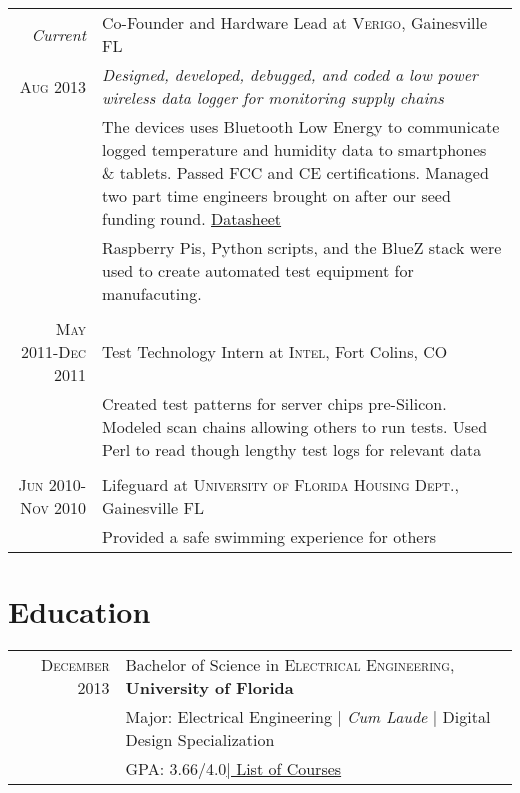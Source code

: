 \documentclass[a4paper,10pt]{article} %
\begin{document}
\begin{tabular}{r|p{11cm}}
\emph{Current} &  Co-Founder and Hardware Lead at \textsc{Verigo}, Gainesville FL \\
\textsc{Aug 2013} & \emph{Designed, developed, debugged, and coded a low power wireless data logger for monitoring supply chains}\\
&\footnotesize{The devices uses Bluetooth Low Energy to communicate logged temperature and humidity data to smartphones \& tablets. Passed FCC and CE certifications. Managed two part time engineers brought on after our seed funding round. \href{http://verigo.io/hardware.html}{Datasheet}}\\
&\footnotesize{Raspberry Pis, Python scripts, and the BlueZ stack were used to create automated test equipment for manufacuting.}\\
\multicolumn{2}{c}{} \\


\textsc{May 2011-Dec 2011} & Test Technology Intern at \textsc{Intel}, Fort Colins, CO \emph{}\\
& \footnotesize{Created test patterns for server chips pre-Silicon. Modeled scan chains allowing others to run tests. Used Perl to read though lengthy test logs for relevant data}\\
\multicolumn{2}{c}{} \\


\textsc{Jun 2010-Nov 2010} & Lifeguard at \textsc{University of Florida Housing Dept.}, Gainesville FL \emph{}\\
& \footnotesize{Provided a safe swimming experience for others}\\
\end{tabular}


\section{Education}

\begin{tabular}{rl}
\textsc{December} 2013 & Bachelor of Science in \textsc{Electrical Engineering}, \textbf{University of Florida}\\
& \small{Major: Electrical Engineering  | \emph{Cum Laude}  |  Digital Design Specialization}\\
&\normalsize \textsc{GPA}: 3.66/4.0\hyperlink{grds}{\hfill | \footnotesize List of Courses}\\


\end{tabular}
\end{document}
